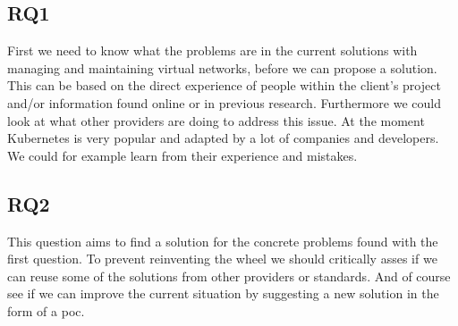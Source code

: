 \subsection{RQ1}
\label{subsec:rq1}
First we need to know what the problems are in the current solutions with managing and maintaining virtual networks, before we can propose a solution. This can be based on the direct experience of people within the client's project and/or information found online or in previous research. Furthermore we could look at what other providers are doing to address this issue. At the moment Kubernetes is very popular and adapted by a lot of companies and developers. We could for example learn from their experience and mistakes.

\subsection{RQ2}
\label{subsec:rq2}
This question aims to find a solution for the concrete problems found with the first question. To prevent reinventing the wheel we should critically asses if we can reuse some of the solutions from other providers or standards. And of course see if we can improve the current situation by suggesting a new solution in the form of a \gls{poc}.
